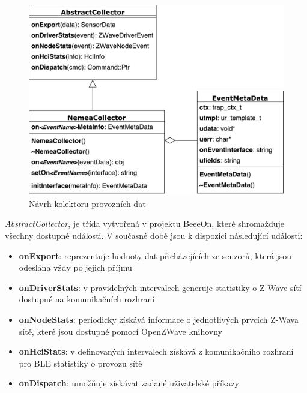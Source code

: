 \begin{figure}[ht]
   \begin{center}
   \includegraphics[scale=0.5]{pictures/modelTrid}
   \caption{Návrh kolektoru provozních dat}
   \label{obr.modelTrid}
   \end{center}
   \end{figure}
 
 \textit{AbstractCollector}, je třída vytvořená v projektu BeeeOn, které shromažďuje všechny dostupné události.
 V současné době jsou k dispozici následující události:
 \begin{itemize}
  \item \textbf{onExport}:
   reprezentuje hodnoty dat přicházejících ze senzorů, která jsou odeslána vždy po jejich příjmu
   
  \item \textbf{onDriverStats}:
   v pravidelných intervalech generuje statistiky o Z-Wave sítí dostupné na komunikačních 
   rozhraní
   
  \item \textbf{onNodeStats}:
   periodicky získává informace o jednotlivých prvcích Z-Wava sítě, které jsou dostupné pomocí
   OpenZWave knihovny
   
  \item \textbf{onHciStats}:
   v definovaných intervalech získává z komunikačního rozhraní pro BLE statistiky o provozu
   sítě
  
  \item \textbf{onDispatch}:
  umožňuje získávat zadané uživatelské příkazy
 \end{itemize}

